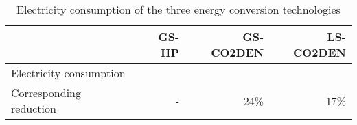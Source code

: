 \begin{table}[htp]
\centering
\caption{Electricity consumption of the three energy conversion technologies}\vspace{2mm}
\label{tab:V_el} 
\begin{tabular}{lrrr}
	\toprule
	& GS-HP & GS-CO2DEN & LS-CO2DEN \\ \midrule
	Electricity consumption & & & \\
	Corresponding reduction & - & 24\% &  17\% \\
	\bottomrule
\end{tabular}
\end{table}
